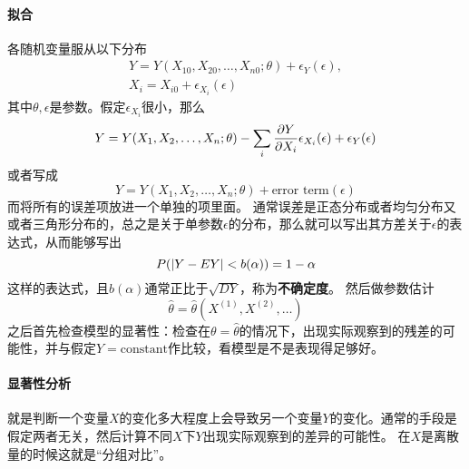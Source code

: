 \documentclass[UTF8, a4paper]{ctexart}
\begin{document}
\paragraph{拟合} 各随机变量服从以下分布
\[
    \begin{split}
        Y = Y(X_{10}, X_{20}, \ldots, X_{n0}; \theta) + \epsilon_Y(\epsilon), \\
        X_i = X_{i0} + \epsilon_{X_i}(\epsilon)
    \end{split}
\]
其中$\theta, \epsilon$是参数。假定$\epsilon_{X_i}$很小，那么
\[
    Y = Y(X_{1}, X_{2}, \ldots, X_{n}; \theta) - \sum_i \pdv{Y}{X_i} \epsilon_{X_i} (\epsilon) + \epsilon_Y(\epsilon)
\]
或者写成
\[
    Y = Y(X_{1}, X_{2}, \ldots, X_{n}; \theta) + \text{error term}(\epsilon)
\]
而将所有的误差项放进一个单独的项里面。
通常误差是正态分布或者均匀分布又或者三角形分布的，总之是关于单参数$\epsilon$的分布，那么就可以写出其方差关于$\epsilon$的表达式，从而能够写出
\[
    P(\abs{Y - EY} < b(\alpha)) = 1 - \alpha
\]
这样的表达式，且$b(\alpha)$通常正比于$\sqrt{DY}$，称为\textbf{不确定度}。
然后做参数估计
\[
    \hat{\theta} = \hat{\theta} (X^{(1)}, X^{(2)}, \ldots)
\]
之后首先检查模型的显著性：检查在$\theta = \hat{\theta}$的情况下，出现实际观察到的残差的可能性，并与假定$Y=\text{constant}$作比较，看模型是不是表现得足够好。

\paragraph{显著性分析} 就是判断一个变量$X$的变化多大程度上会导致另一个变量$Y$的变化。通常的手段是假定两者无关，然后计算不同$X$下$Y$出现实际观察到的差异的可能性。
在$X$是离散量的时候这就是“分组对比”。
\end{document}
